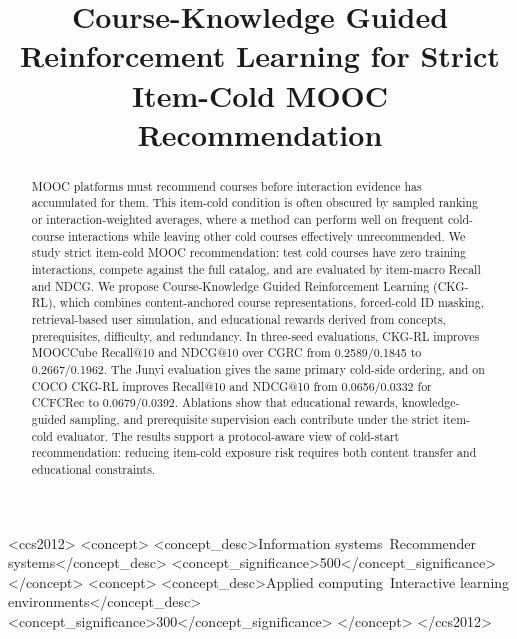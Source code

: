 \documentclass[sigconf,anonymous,review]{acmart}
\begin{document}
\title{Course-Knowledge Guided Reinforcement Learning for Strict Item-Cold MOOC Recommendation}

\begin{abstract}
MOOC platforms must recommend courses before interaction evidence has accumulated for them. This item-cold condition is often obscured by sampled ranking or interaction-weighted averages, where a method can perform well on frequent cold-course interactions while leaving other cold courses effectively unrecommended. We study strict item-cold MOOC recommendation: test cold courses have zero training interactions, compete against the full catalog, and are evaluated by item-macro Recall and NDCG. We propose Course-Knowledge Guided Reinforcement Learning (CKG-RL), which combines content-anchored course representations, forced-cold ID masking, retrieval-based user simulation, and educational rewards derived from concepts, prerequisites, difficulty, and redundancy. In three-seed evaluations, CKG-RL improves MOOCCube Recall@10 and NDCG@10 over CGRC from 0.2589/0.1845 to 0.2667/0.1962. The Junyi evaluation gives the same primary cold-side ordering, and on COCO CKG-RL improves Recall@10 and NDCG@10 from 0.0656/0.0332 for CCFCRec to 0.0679/0.0392. Ablations show that educational rewards, knowledge-guided sampling, and prerequisite supervision each contribute under the strict item-cold evaluator. The results support a protocol-aware view of cold-start recommendation: reducing item-cold exposure risk requires both content transfer and educational constraints.
\end{abstract}

\begin{CCSXML}
<ccs2012>
   <concept>
       <concept_desc>Information systems~Recommender systems</concept_desc>
       <concept_significance>500</concept_significance>
   </concept>
   <concept>
       <concept_desc>Applied computing~Interactive learning environments</concept_desc>
       <concept_significance>300</concept_significance>
   </concept>
</ccs2012>
\end{CCSXML}



\maketitle
\end{document}
